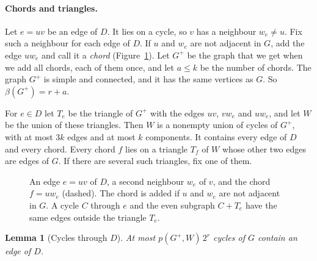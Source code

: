 \documentclass[11pt]{article}
\newtheorem{lemma}[theorem]{Lemma}
\theoremstyle{definition}
\theoremstyle{remark}
\numberwithin{equation}{section}
\begin{document}
\paragraph{Chords and triangles.}
Let $e=uv$ be an edge of $D$. It lies on a cycle, so $v$ has a neighbour $w_e\ne u$. Fix such a
neighbour for each edge of $D$. If $u$ and $w_e$ are not adjacent in $G$, add the edge $uw_e$ and
call it a \emph{chord} (Figure~\ref{fig:chord}). Let $G^{+}$ be the graph that we get when we add
all chords, each of them once, and let $a\le k$ be the number of chords. The graph $G^{+}$ is simple
and connected, and it has the same vertices as $G$. So $\beta(G^{+})=r+a$.

For $e\in D$ let $T_e$ be the triangle of $G^{+}$ with the edges $uv$, $vw_e$ and $uw_e$, and let
$W$ be the union of these triangles. Then $W$ is a nonempty union of cycles of $G^{+}$, with at most
$3k$ edges and at most $k$ components. It contains every edge of $D$ and every chord. Every chord
$f$ lies on a triangle $T_f$ of $W$ whose other two edges are edges of $G$. If there are several
such triangles, fix one of them.

\begin{figure}[ht]
\centering
{}
\caption{An edge $e=uv$ of $D$, a second neighbour $w_e$ of $v$, and the chord $f=uw_e$ (dashed).
The chord is added if $u$ and $w_e$ are not adjacent in $G$. A cycle $C$ through $e$ and the even
subgraph $C+T_e$ have the same edges outside the triangle $T_e$.}
\label{fig:chord}
\end{figure}

\begin{lemma}[Cycles through $D$]\label{lem:through}
At most $p(G^{+},W)\,2^{r}$ cycles of $G$ contain an edge of $D$.
\end{lemma}
\end{document}
